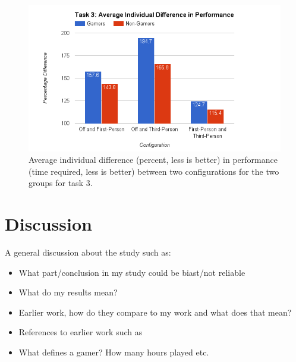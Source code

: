 \documentclass[runningheads,a4paper,oribibl]{llncs}
\begin{document}
\begin{figure}
   \centering
   \includegraphics[width=\textwidth]{ExternalMaterial/Task3GraphD}
   \caption{Average individual difference (percent, less is better) in performance (time required, less is better) between two configurations for the two groups for task 3.} \label{fig:Task3GraphD}
\end{figure}




























\section{Discussion} \label{sec:Discussion}
A general discussion about the study such as:
\begin{itemize}
	\item What part/conclusion in my study could be biast/not reliable
	\item What do my results mean?
	\item Earlier work, how do they compare to my work and what does that mean?
	\item References to earlier work such as~\cite{schmierbach2011exploring}
	\item What defines a gamer? How many hours played etc.
\end{itemize}
\end{document}

